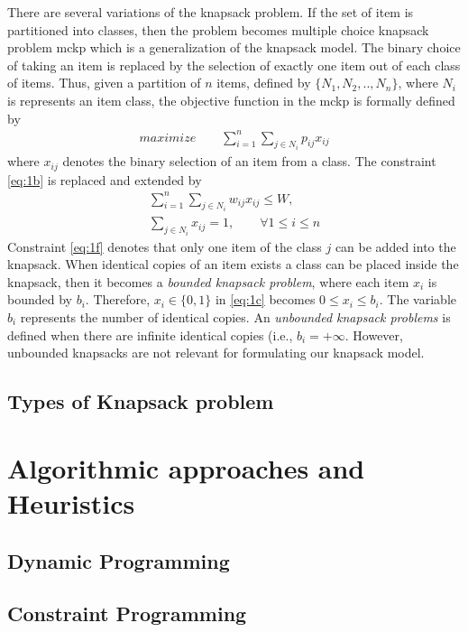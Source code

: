 There are several variations of the knapsack problem. If the set of item is partitioned into classes, then the problem becomes multiple choice knapsack problem \gls{mckp} which is a generalization of the knapsack model. The binary choice of taking an item is replaced by the selection of exactly one item out of each class of items\parencite{Kellerer2004TheProblem}. Thus, given a partition of $n$ items, defined by $\{N_1, N_2,.., N_n\}$, where $N_i$ is represents an item class, the objective function in the \gls{mckp} is formally defined by
\begin{align}
    maximize \qquad \sum_{i=1}^n \sum_{j \in N_i} p_{ij}x_{ij}\label{eq:1d}
\end{align}
where $x_{ij}$ denotes the binary selection of an item from a class. The constraint \ref{eq:1b} is replaced and extended by 
\begin{gather}
    \sum_{i=1}^n \sum_{j \in N_i} w_{ij}x_{ij} \leq W,\label{eq:1e} \\
    \sum_{j \in N_i} x_{ij} = 1, \qquad \forall 1 \leq i \leq n\label{eq:1f}
\end{gather}
Constraint \ref{eq:1f} denotes that only one item of the class $j$ can be added into the knapsack. When identical copies of an item exists a class can be placed inside the knapsack, then it becomes a \textit{bounded knapsack problem}, where each item $x_i$ is bounded by $b_i$\parencite{Kellerer2004TheProblem}. Therefore, $x_i \in \{0,1\}$ in \ref{eq:1c} becomes $0\leq x_i \leq b_i$. The variable $b_i$ represents the number of identical copies. An \textit{unbounded knapsack problems} is defined when there are infinite identical copies (i.e., $b_i = +\infty$. However, unbounded knapsacks are not relevant for formulating our knapsack model.

\subsection{Types of Knapsack problem}

\section{Algorithmic approaches and Heuristics}
\subsection{Dynamic Programming}
\subsection{Constraint Programming}
